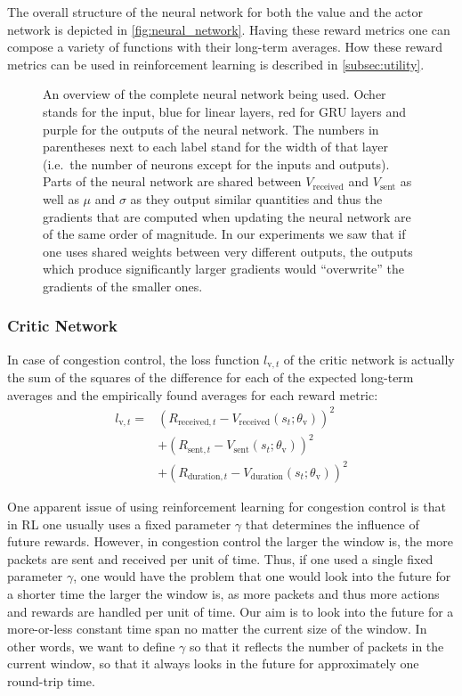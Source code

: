 \documentclass[sigconf]{acmart}
\begin{document}
The overall structure of the neural network for both the value and the actor network is depicted in \autoref{fig:neural_network}. Having these reward metrics one can compose a variety of functions with their long-term averages. How these reward metrics can be used in reinforcement learning is described in \autoref{subsec:utility}. 

\begin{figure}



\caption{An overview of the complete neural network being used. Ocher stands for the input, blue for linear layers, red for GRU layers and purple for the outputs of the neural network. The numbers in parentheses next to each label stand for the width of that layer (i.e.~the number of neurons except for the inputs and outputs). Parts of the neural network are shared between $V_\text{received}$ and $V_\text{sent}$ as well as $\mu$ and $\sigma$ as they output similar quantities and thus the gradients that are computed when updating the neural network are of the same order of magnitude. In our experiments we saw that if one uses shared weights between very different outputs, the outputs which produce significantly larger gradients would ``overwrite'' the gradients of the smaller ones.}
\label{fig:neural_network}
\end{figure}

\subsubsection{Critic Network}
\label{subsubsec:critic}

In case of congestion control, the loss function $l_{\text{v},t}$ of the critic network is actually the sum of the squares of the difference for each of the expected long-term averages and the empirically found averages for each reward metric:
\begin{align*}
l_{\text{v},t} =& \left(R_{\text{received},t} - V_\text{received}(s_t; \theta_\text{v})\right)^2 \\
&+\left(R_{\text{sent},t} - V_\text{sent}(s_t; \theta_\text{v})\right)^2 \\
&+\left(R_{\text{duration},t} - V_\text{duration}(s_t; \theta_\text{v})\right)^2
\end{align*}

One apparent issue of using reinforcement learning for congestion control is that in RL one usually uses a fixed parameter $\gamma$ that determines the influence of future rewards. However, in congestion control the larger the window is, the more packets are sent and received per unit of time. Thus, if one used a single fixed parameter $\gamma$, one would have the problem that one would look into the future for a shorter time the larger the window is, as more packets and thus more actions and rewards are handled per unit of time. Our aim is to look into the future for a more-or-less constant time span no matter the current size of the window. In other words, we want to define $\gamma$ so that it reflects the number of packets in the current window, so that it always looks in the future for approximately one round-trip time. 
\end{document}
